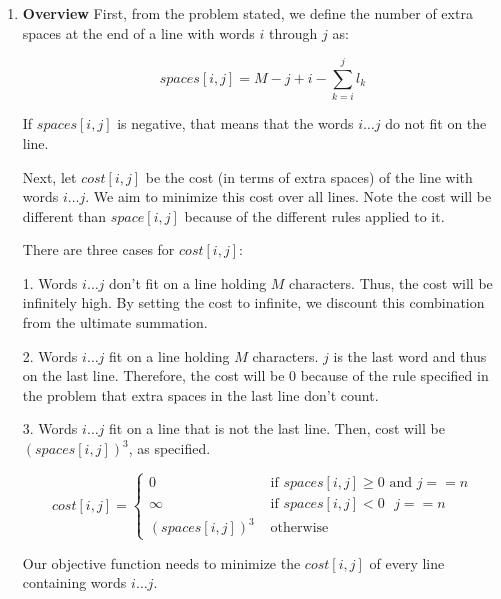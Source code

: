 \documentclass[a4paper]{report}
\begin{document}
\begin{enumerate}
    \par
    \bigskip
    \pagebreak
    \setcounter{equation}{0}
    
    \item 
      {\bf Overview}
      First, from the problem stated, 
      we define the number of extra spaces at the end of a line with words $i$ through $j$ as:

        $$ spaces[i,j] = M - j + i - \sum_{k=i}^{j} l_{k}$$

      If $spaces[i,j]$ is negative, that means that the words $i \dots j$ do not fit on the line. 
      
      Next, let $cost[i,j]$ be the cost (in terms of extra spaces) of the line with words $i \dots j$. We aim to minimize
      this cost over all lines. Note the cost will be different than $space[i,j]$ because of the different rules
      applied to it.

      There are three cases for $cost[i,j]$:

      1. Words $i \dots j$ don't fit on a line holding $M$ characters. Thus, the cost will be infinitely high.
      By setting the cost to infinite, we discount this combination from the ultimate summation.

      2. Words $i \dots j$ fit on a line holding $M$ characters. $j$ is the last word and thus on the last line.
      Therefore, the cost will be 0 because of the rule specified in the problem that extra spaces in the last line don't count.

      3. Words $i \dots j$ fit on a line that is not the last line. Then, cost will be $(spaces[i,j])^3$, as specified. 

      \begin{displaymath}
        cost[i,j] = \left\{
          \begin{array}{lr}
            0  &   \text{ if $spaces[i,j] \geq 0$ and $j == n$}\\
            \infty  &   \text{ if $spaces[i,j] < 0$ $j == n$}\\
            \text{$(spaces[i,j])^3$} &  \text{ otherwise }
          \end{array}
          \right.
        \end{displaymath} 

      Our objective function needs to minimize the $cost[i,j]$ of every line containing words $i \dots j$. 


\end{enumerate}
\end{document}
